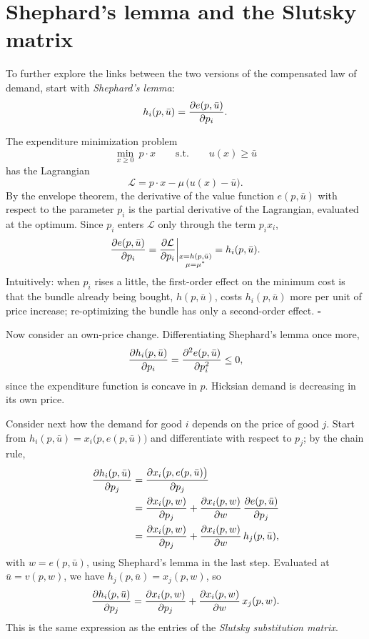 \documentclass[11pt]{article}
\begin{document}
\section{Shephard's lemma and the Slutsky matrix}

To further explore the links between the two versions of the compensated law of
demand, start with \emph{Shephard's lemma}:
\[ h_i(p,\bar u)=\frac{\partial e(p,\bar u)}{\partial p_i}. \]

 The expenditure minimization problem
\[ \min_{x\ge0}\ p\cdot x\qquad\text{s.t.}\qquad u(x)\ge\bar u \]
has the Lagrangian
\[ \mathcal{L}=p\cdot x-\mu\,\bigl(u(x)-\bar u\bigr). \]
By the envelope theorem, the derivative of the value function $e(p,\bar u)$ with
respect to the parameter $p_i$ is the partial derivative of the Lagrangian,
evaluated at the optimum. Since $p_i$ enters $\mathcal{L}$ only through the term
$p_i x_i$,
\[ \frac{\partial e(p,\bar u)}{\partial p_i}
   =\frac{\partial \mathcal{L}}{\partial p_i}\bigg|_{\substack{x=h(p,\bar u)\\ \mu=\mu^{*}}}
   =h_i(p,\bar u). \]
Intuitively: when $p_i$ rises a little, the first-order effect on the minimum cost
is that the bundle already being bought, $h(p,\bar u)$, costs $h_i(p,\bar u)$ more
per unit of price increase; re-optimizing the bundle has only a second-order effect.
\hfill$\square$

Now consider an own-price change. Differentiating Shephard's lemma once more,
\[ \frac{\partial h_i(p,\bar u)}{\partial p_i}=\frac{\partial^2 e(p,\bar u)}{\partial p_i^2}\le 0 , \]
since the expenditure function is concave in $p$. Hicksian demand is decreasing in
its own price.

Consider next how the demand for good $i$ depends on the price of good $j$. Start
from $h_i(p,\bar u)=x_i\bigl(p,e(p,\bar u)\bigr)$ and differentiate with respect to
$p_j$; by the chain rule,
\begin{align*}
  \frac{\partial h_i(p,\bar u)}{\partial p_j}
    &=\frac{\partial x_i\bigl(p,e(p,\bar u)\bigr)}{\partial p_j}\\
    &=\frac{\partial x_i(p,w)}{\partial p_j}+\frac{\partial x_i(p,w)}{\partial w}\,\frac{\partial e(p,\bar u)}{\partial p_j}\\
    &=\frac{\partial x_i(p,w)}{\partial p_j}+\frac{\partial x_i(p,w)}{\partial w}\,h_j(p,\bar u),
\end{align*}
with $w=e(p,\bar u)$, using Shephard's lemma in the last step. Evaluated at
$\bar u=v(p,w)$, we have $h_j(p,\bar u)=x_j(p,w)$, so
\[ \frac{\partial h_i(p,\bar u)}{\partial p_j}=\frac{\partial x_i(p,w)}{\partial p_j}+\frac{\partial x_i(p,w)}{\partial w}\,x_j(p,w). \]
This is the same expression as the entries of the \emph{Slutsky substitution
matrix}.
\end{document}

